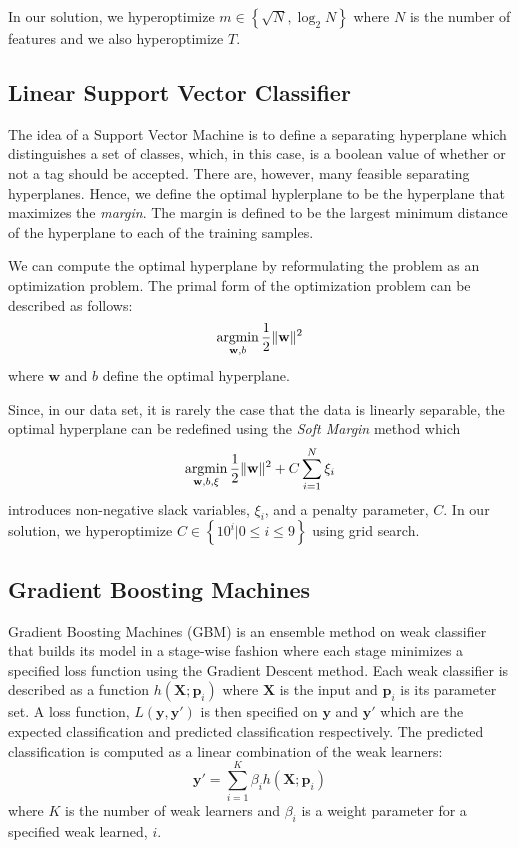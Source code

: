 \documentclass{sig-alternate}
\renewcommand{\vec}[1]{\mathbf{#1}}
\newcommand{\argmin}{\operatornamewithlimits{argmin}}
\begin{document}
		In our solution, we hyperoptimize $m \in \left\{\sqrt{N},
		\log_2{N}\right\}$ where $N$ is the number of features and we also
		hyperoptimize $T$.

	\subsection{Linear Support Vector Classifier} %
	\label{sub:Linear Support Vector Classifier}
		The idea of a Support Vector Machine is to define a separating hyperplane
		which distinguishes a set of classes, which, in this case, is a boolean
		value of whether or not a tag should be accepted. There are, however,
		many feasible separating hyperplanes. Hence, we define the optimal
		hyplerplane to be the hyperplane that maximizes the \emph{margin}. The
		margin is defined to be the largest minimum distance of the hyperplane to
		each of the training samples.

		We can compute the optimal hyperplane by reformulating the problem as an
		optimization problem. The primal form of the optimization problem can be
		described as follows:
		\[
			\argmin_{\vec{w}, b} \frac{1}{2}\|\vec{w}\|^2
		\]
		where $\vec{w}$ and $b$ define the optimal hyperplane.

		Since, in our data set, it is rarely the case that the data is linearly
		separable, the optimal hyperplane can be redefined using the \emph{Soft
		Margin} method which 
		\[
			\argmin_{\vec{w}, b, \vec{\xi}} \frac{1}{2}\|\vec{w}\|^2 + C\sum_{i=1}^N \xi_i
		\]
		introduces non-negative slack variables, $\xi_i$, and a penalty
		parameter, $C$.\cite{cortes1995} In our solution, we hyperoptimize $C \in \left\{10^i |
		0 \leq i \leq 9\right\}$ using grid search.

	\subsection{Gradient Boosting Machines} %
	\label{sub:Gradient Boosting}
		Gradient Boosting Machines (GBM) is an ensemble method on weak
		classifier that builds its model in a stage-wise fashion where each
		stage minimizes a specified loss function using the Gradient Descent
		method.\cite{friedman2001} Each weak classifier is described as a
		function $h(\vec{X};\vec{p}_i)$ where $\vec{X}$ is the input and
		$\vec{p}_i$ is its parameter set. A loss function, $L(\vec{y},
		\vec{y}')$ is then specified on $\vec{y}$ and $\vec{y}'$ which are the
		expected classification and predicted classification respectively. The
		predicted classification is computed as a linear combination of the
		weak learners:
		\[
			\vec{y}' = \sum_{i=1}^K \beta_i h(\vec{X}; \vec{p}_i)
		\]
		where $K$ is the number of weak learners and $\beta_i$ is a weight
		parameter for a specified weak learned, $i$.
\end{document}
